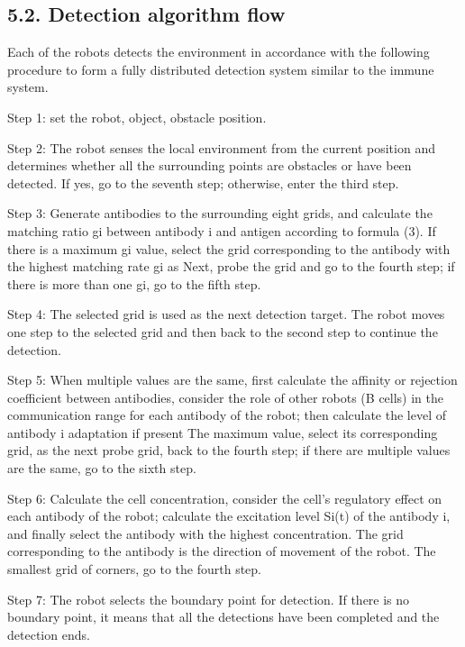 \documentclass[Proceedings]{ascelike}
\begin{document}
\subsection{5.2. Detection algorithm flow}
Each of the robots detects the environment in accordance with the following procedure to form a fully distributed detection system similar to the immune system.
\par
Step 1: set the robot, object, obstacle position.
\par
Step 2: The robot senses the local environment from the current position and determines whether all the surrounding points are obstacles or have been detected. If yes, go to the seventh step; otherwise, enter the third step.
\par
Step 3: Generate antibodies to the surrounding eight grids, and calculate the matching ratio gi between antibody i and antigen according to formula (3). If there is a maximum gi value, select the grid corresponding to the antibody with the highest matching rate gi as Next, probe the grid and go to the fourth step; if there is more than one gi, go to the fifth step.
\par
Step 4: The selected grid is used as the next detection target. The robot moves one step to the selected grid and then back to the second step to continue the detection.
\par
Step 5: When multiple values are the same, first calculate the affinity or rejection coefficient between antibodies, consider the role of other robots (B cells) in the communication range for each antibody of the robot; then calculate the level of antibody i adaptation if present The maximum value, select its corresponding grid, as the next probe grid, back to the fourth step; if there are multiple values are the same, go to the sixth step.
\par
Step 6: Calculate the cell concentration, consider the cell's regulatory effect on each antibody of the robot; calculate the excitation level Si(t) of the antibody i, and finally select the antibody with the highest concentration. The grid corresponding to the antibody is the direction of movement of the robot. The smallest grid of corners, go to the fourth step.
\par
Step 7: The robot selects the boundary point for detection. If there is no boundary point, it means that all the detections have been completed and the detection ends.
\end{document}

